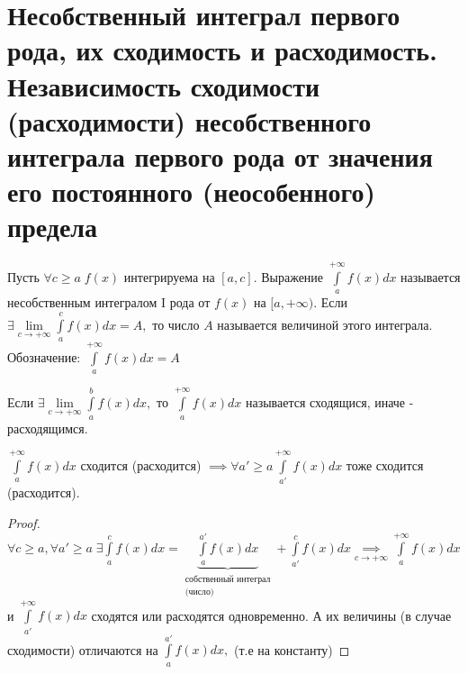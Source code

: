 \documentclass[../main.tex]{subfiles}
\begin{document}

\section{Несобственный интеграл первого рода, их сходимость и расходимость. Независимость сходимости (расходимости) несобственного интеграла первого рода от значения его постоянного (неособенного) предела}


\begin{definition}
    Пусть $\forall c\geqslant a\; f(x)$ интегрируема на $[a,c]$. Выражение $\int\limits_{a   }^{+\infty}f(x)dx  $ называется несобственным интегралом I рода от $f(x) \text{ на } [a,+\infty).$ Если $\exists \lim\limits_{c \to +\infty}\int\limits_{a}^{c} f(x)dx=A,$ то число $A$ называется величиной этого интеграла. Обозначение: $\int\limits_{a    }^{+\infty}f(x)dx=A$   
\end{definition}
\begin{definition}
    Если $\exists \lim\limits_{c    \to +\infty}\int\limits_{a  }^{b    } f(x)dx, $ то $\int\limits_{a  }^{+\infty}f(x)dx  $ называется сходящися, иначе - расходящимся.
\end{definition}

\begin{theorem}
    $\int\limits_{a }^{+\infty} f(x)dx  $ сходится (расходится) $\implies \forall a' \geqslant a \int\limits_{a'}^{+\infty}f(x)dx $ тоже сходится (расходится).
\end{theorem}
\begin{proof}
    $\forall c\geqslant a, \forall a'\geqslant a \; \exists \int\limits_{a  }^{c    } f(x)dx=\underbrace{\int\limits_{a }^{a'}  f(x)dx}_{\substack{\text{собственный интеграл}\\\text{(число)}}}+ \int\limits_{a'}^{c}f(x)dx\underset{c\to+\infty}{\implies} \int\limits_{a   }^{+\infty}f(x)dx $ и $\int\limits_{a'}^{+\infty}f(x)dx $ сходятся или расходятся одновременно. А их величины (в случае сходимости) отличаются на $\int\limits_{a   }^{a'}f(x)dx,$ (т.е на  константу)
    
\end{proof}
\end{document}
